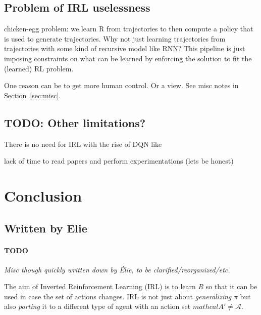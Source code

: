 \documentclass{article}
\begin{document}
\subsection{Problem of IRL uselessness}

chicken-egg problem: we learn R from trajectories to then compute a policy that is used to generate trajectories. Why not just learning trajectories from trajectories with some kind of recursive model like RNN? This pipeline is just imposing constraints on what can be learned by enforcing the solution to fit the (learned) RL problem.

One reason can be to get more human control. Or a view. See misc notes in Section~\ref{sec:misc}.

\subsection{TODO: Other limitations?}

There is no need for IRL with the rise of DQN like \cite{Mnih15}

lack of time to read papers and perform experimentations (lets be honest)

\section{Conclusion}


\subsection{Written by Elie \label{sec:misc}}

\paragraph{TODO}
\emph{Misc though quickly written down by Élie, to be clarified/reorganized/etc.}

The aim of Inverted Reinforcement Learning (IRL) is to learn $R$ so that it can be used in case the set of actions changes. IRL is not just about \emph{generalizing} $\pi$ but also \emph{porting} it to a different type of agent with an action set $mathcal A' \neq \mathcal A$. %
\end{document}
